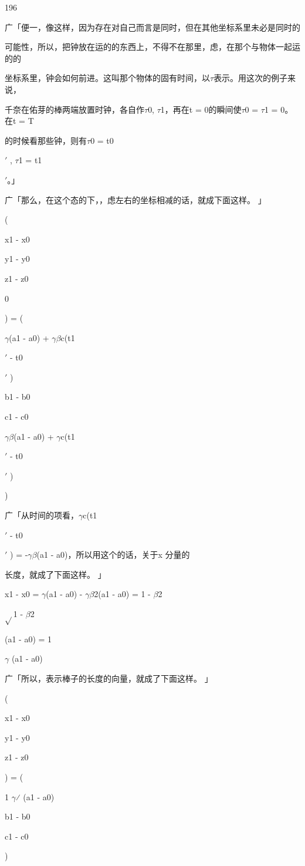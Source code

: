 196\par
广「便一，像这样，因为存在对自己而言是同时，但在其他坐标系里未必是同时的\par
可能性，所以，把钟放在运的的东西上，不得不在那里，虑，在那个与物体一起运的的\par
坐标系里，钟会如何前进。这叫那个物体的固有时间，以$\tau$表示。用这次的例子来说，\par
千奈在佑芽的棒两端放置时钟，各自作$\tau$0, $\tau$1，再在t = 0的瞬间使$\tau$0 = $\tau$1 = 0。在t = T\par
的时候看那些钟，则有$\tau$0 = t0\par
$\prime$ , $\tau$1 = t1\par
$\prime$。」\par
广「那么，在这个态的下，，虑左右的坐标相减的话，就成下面这样。 」\par
(\par
x1 - x0\par
y1 - y0\par
z1 - z0\par
0\par
) = (\par
$\gamma$(a1 - a0) + $\gamma$$\beta$c(t1\par
$\prime$ - t0\par
$\prime$ )\par
b1 - b0\par
c1 - c0\par
$\gamma$$\beta$(a1 - a0) + $\gamma$c(t1\par
$\prime$ - t0\par
$\prime$ )\par
)\par
广「从时间的项看，$\gamma$c(t1\par
$\prime$ - t0\par
$\prime$ ) = -$\gamma$$\beta$(a1 - a0)，所以用这个的话，关于x 分量的\par
长度，就成了下面这样。 」\par
x1 - x0 = $\gamma$(a1 - a0) - $\gamma$$\beta$2(a1 - a0) = 1 - $\beta$2\par
$\sqrt{}$1 - $\beta$2\par
(a1 - a0) = 1\par
$\gamma$ (a1 - a0)\par
广「所以，表示棒子的长度的向量，就成了下面这样。 」\par
(\par
x1 - x0\par
y1 - y0\par
z1 - z0\par
) = (\par
1 $\gamma$⁄ (a1 - a0)\par
b1 - b0\par
c1 - c0\par
)\par

